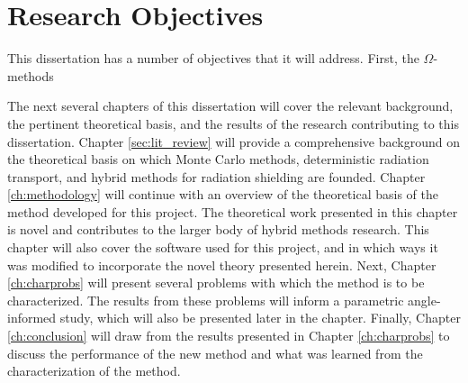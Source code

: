\section{Research Objectives}
\label{sec:objectives}

This dissertation has a number of objectives that it will address. First, the
$\Omega$-methods

The next several chapters of this dissertation will cover the relevant
background, the pertinent theoretical basis, and the results of the research
contributing to this dissertation. Chapter \ref{sec:lit_review} will provide a
comprehensive background on the theoretical basis on which Monte Carlo methods,
deterministic radiation transport, and hybrid methods for radiation shielding
are founded. Chapter \ref{ch:methodology} will continue with an overview of the
theoretical basis of the method developed for this project. The theoretical work
presented in this chapter is novel and contributes to the larger body of hybrid
methods research. This chapter will also cover the software used for this
project, and in which ways it was modified to incorporate the novel theory
presented herein. Next, Chapter \ref{ch:charprobs} will present several problems
with which the method is to be characterized. The results from these problems
will inform a parametric angle-informed study, which will also be presented
later in the chapter. Finally, Chapter \ref{ch:conclusion} will draw from the
results presented in Chapter \ref{ch:charprobs} to discuss the performance of
the new method and what was learned from the characterization of the method.


